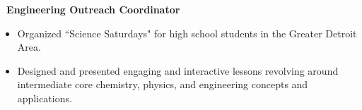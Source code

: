 \documentclass[]{article}
\begin{document}
 \newline
	{\bf \ Engineering Outreach Coordinator}
	\begin{itemize}[label={$\bullet$}]
		\item Organized ``Science Saturdays" for high school students in the Greater Detroit Area.
		\item Designed and presented engaging and interactive lessons revolving around intermediate core chemistry, physics, and engineering concepts and applications.
	\end{itemize}
\fi










\end{document}
